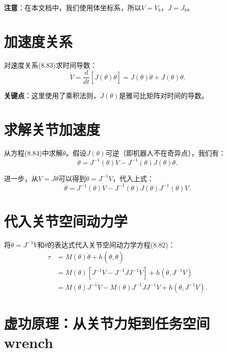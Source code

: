 \documentclass{article}
\begin{document}
\textbf{注意}：在本文档中，我们使用体坐标系，所以$V = V_b$，$J = J_b$。

\section{加速度关系}

对速度关系(8.83)求时间导数：
\begin{equation}
\dot{V} = \frac{d}{dt}[J(\theta)\dot{\theta}] = \dot{J}(\theta)\dot{\theta} + J(\theta)\ddot{\theta}. \tag{8.84}
\end{equation}

\textbf{关键点}：这里使用了乘积法则，$\dot{J}(\theta)$是雅可比矩阵对时间的导数。

\section{求解关节加速度}

从方程(8.84)中求解$\ddot{\theta}$。假设$J(\theta)$可逆（即机器人不在奇异点），我们有：
\begin{equation}
\ddot{\theta} = J^{-1}(\theta)\dot{V} - J^{-1}(\theta)\dot{J}(\theta)\dot{\theta}. \tag{8.86}
\end{equation}

进一步，从$V = J\dot{\theta}$可以得到$\dot{\theta} = J^{-1}V$，代入上式：
\begin{equation}
\ddot{\theta} = J^{-1}(\theta)\dot{V} - J^{-1}(\theta)\dot{J}(\theta)J^{-1}(\theta)V. \tag{8.86'}
\end{equation}

\section{代入关节空间动力学}

将$\dot{\theta} = J^{-1}V$和$\ddot{\theta}$的表达式代入关节空间动力学方程(8.82)：
\begin{align}
\tau &= M(\theta)\ddot{\theta} + h(\theta, \dot{\theta}) \\
     &= M(\theta)\left[J^{-1}\dot{V} - J^{-1}\dot{J}J^{-1}V\right] + h(\theta, J^{-1}V) \\
     &= M(\theta)J^{-1}\dot{V} - M(\theta)J^{-1}\dot{J}J^{-1}V + h(\theta, J^{-1}V). \tag{8.87}
\end{align}

\section{虚功原理：从关节力矩到任务空间wrench}
\end{document}
